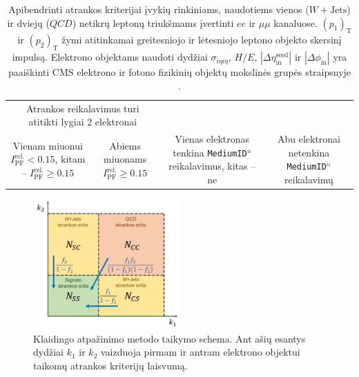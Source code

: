 \documentclass[a4paper, 12pt, oneside]{article}
\newcommand{\ttt}[1]{\texttt{#1}}
\newcommand{\WJets}{W\! +\!\mathrm{Jets}}
\newcommand{\ltq}[1]{{\quotedblbase{}#1\textquotedblleft{}}}
\newcommand{\QCD}{QC\! D}
\newlength\q
\begin{document}
\begin{table}[!t]
\begin{tabular}{|c|c|c|c|}
			\multicolumn{2}{c|}{\multirow{2}{19em}{\centering Atrankos reikalavimus turi atitikti lygiai 2 elektronai}} \\
		\multicolumn{2}{|c|}{ } & \multicolumn{2}{c|}{ } \\
		\hline
		\multirow{3}{9em}{\centering Vienam miuonui $I_{\mathrm{PF}}^{\mathrm{rel.}}<0.15$,
			kitam -- $I_{\mathrm{PF}}^{\mathrm{rel.}}\geqslant 0.15$} &
			\multirow{3}{7em}{\centering Abiems miuonams $I_{\mathrm{PF}}^{\mathrm{rel.}}\geqslant 0.15$} &
			\multirow{3}{10em}{\centering Vienas elektronas tenkina \ltq{\ttt{MediumID}} reikalavimus, kitas -- ne} &
			\multirow{3}{10em}{\centering Abu elektronai netenkina \ltq{\ttt{MediumID}} reikalavimų} \\
		 & & & \\
		 & & & \\
		\hline
	\end{tabular}
	\caption{\label{table:jetSelection} Apibendrinti atrankos kriterijai įvykių rinkiniams, naudotiems vienos ($\WJets$) ir
	dviejų ($\QCD$) netikrų leptonų triukšmams įvertinti $ee$ ir $\mu\mu$ kanaluose.
	$(p_1)_\mathrm{T}$ ir $(p_2)_\mathrm{T}$ žymi atitinkamai greitesniojo ir lėtesniojo leptono objekto skersinį impulsą.
	Elektrono objektams naudoti dydžiai $\sigma_{i\eta i\eta}$, $H/E$, $|\Delta\eta_{\mathrm{in}}^{\mathrm{seed}}|$ ir
	$|\Delta\phi_{\mathrm{in}}|$ yra paaiškinti CMS elektrono ir fotono fizikinių objektų mokslinės grupės straipsnyje \cite{EleID}.}
\end{table}


\begin{figure}[b!]
	\includegraphics[width=0.5\textwidth]{Magistrinis/FRschema.png}
	\vspace{-0.3cm}
	\caption{\label{fig:FRscheme}Klaidingo atpažinimo metodo taikymo schema.
	Ant ašių esantys dydžiai $k_1$ ir $k_2$ vaizduoja pirmam ir antram elektrono objektui taikomų atrankos
	kriterijų laisvumą.}
\end{figure}
\end{document}
